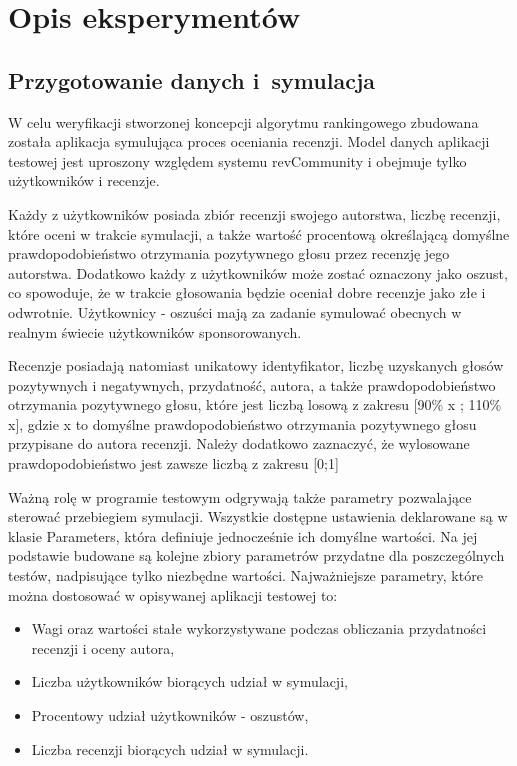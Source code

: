 \section{Opis eksperymentów}

\subsection{Przygotowanie danych i~symulacja}

W celu weryfikacji stworzonej koncepcji algorytmu rankingowego zbudowana została aplikacja symulująca proces oceniania recenzji. Model danych aplikacji testowej jest uproszony względem systemu revCommunity i obejmuje tylko użytkowników i recenzje. 

Każdy z użytkowników posiada zbiór recenzji swojego autorstwa, liczbę recenzji, które oceni w trakcie symulacji, a także wartość procentową określającą  domyślne prawdopodobieństwo otrzymania pozytywnego głosu przez recenzję jego autorstwa. Dodatkowo każdy z użytkowników może zostać oznaczony jako oszust, co spowoduje, że w trakcie głosowania będzie oceniał dobre recenzje jako złe i odwrotnie. Użytkownicy - oszuści mają za zadanie symulować obecnych w realnym świecie użytkowników sponsorowanych.

Recenzje posiadają natomiast unikatowy identyfikator, liczbę uzyskanych głosów pozytywnych i negatywnych, przydatność, autora, a także prawdopodobieństwo otrzymania pozytywnego głosu, które jest liczbą losową z zakresu [90\% x ; 110\% x], gdzie x to domyślne prawdopodobieństwo otrzymania pozytywnego głosu przypisane do autora recenzji. Należy dodatkowo zaznaczyć, że wylosowane prawdopodobieństwo jest zawsze liczbą z zakresu [0;1]

Ważną rolę w programie testowym odgrywają także parametry pozwalające sterować przebiegiem symulacji. Wszystkie dostępne ustawienia deklarowane są w klasie Parameters, która definiuje jednocześnie ich domyślne wartości. Na jej podstawie budowane są kolejne zbiory parametrów przydatne dla poszczególnych testów, nadpisujące tylko niezbędne wartości. Najważniejsze parametry, które można dostosować w opisywanej aplikacji testowej to:

\begin{itemize}
\item Wagi oraz wartości stałe wykorzystywane podczas obliczania przydatności recenzji i oceny autora,
\item Liczba użytkowników biorących udział w symulacji,
\item Procentowy udział użytkowników - oszustów,
\item Liczba recenzji biorących udział w symulacji.
\end{itemize}


